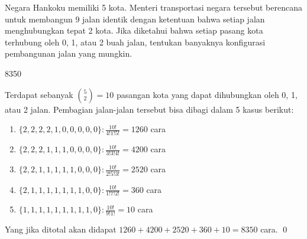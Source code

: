 \documentclass[12pt]{scrartcl}
\begin{document}
	\begin{soaljawab}
		Negara Hankoku memiliki 5 kota. Menteri transportasi negara tersebut berencana untuk
		membangun 9 jalan identik dengan ketentuan bahwa setiap jalan menghubungkan
		tepat 2 kota. Jika diketahui bahwa setiap pasang kota terhubung oleh 0, 1, atau 2
		buah jalan, tentukan banyaknya konfigurasi pembangunan jalan yang mungkin.
		
		\begin{jawaban}
		8350
		\end{jawaban}
		\begin{solusi}
		Terdapat sebanyak ${5 \choose 2} = 10$ pasangan kota yang dapat dihubungkan oleh 0, 1, atau 2 jalan. Pembagian jalan-jalan tersebut bisa dibagi dalam 5 kasus berikut:
		\begin{enumerate}
			\item $\{2,2,2,2,1,0,0,0,0,0\}: \frac{10!}{4!1!5!}=1260$ cara
			\item $\{2,2,2,1,1,1,0,0,0,0\}: \frac{10!}{3!3!4!}=4200$ cara
			\item $\{2,2,1,1,1,1,1,0,0,0\}: \frac{10!}{2!5!3!}=2520$ cara
			\item $\{2,1,1,1,1,1,1,1,0,0\}: \frac{10!}{1!7!2!}=360$ cara
			\item $\{1,1,1,1,1,1,1,1,1,0\}: \frac{10!}{9!1!}=10$ cara
		\end{enumerate}
		Yang jika ditotal akan didapat $1260+4200+2520+360+10=8350$ cara. \qed
		\end{solusi}
	\end{soaljawab}
	
\end{document}
